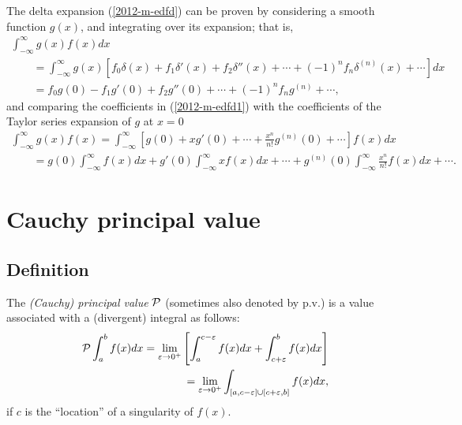 {\color{OliveGreen}
\bproof
The delta expansion (\ref{2012-m-edfd}) can be proven by considering a smooth function $g(x)$, and integrating over its expansion; that is,
\begin{equation}
\begin{split}
 \int_{-\infty}^\infty g(x) f(x) dx  \\
\qquad =
 \int_{-\infty}^\infty  g(x) \left[
f_0 \delta (x) +
f_1 \delta' (x) +
f_2 \delta'' (x)
+ \cdots  +
(-1)^n f_n \delta^{(n)}(x)
+ \cdots \right] dx \\
\qquad =
f_0 g(0) - f_1 g'(0) + f_2 g''(0) +\cdots  + (-1)^n f_n g^{(n)}
+ \cdots
,
\end{split}
\label{2012-m-edfd1}
\end{equation}
and comparing the coefficients in (\ref{2012-m-edfd1})
with the coefficients  of  the Taylor series expansion of $g$ at $x=0$
\begin{equation}
\begin{split}
 \int_{-\infty}^\infty g(x) f(x)  =
 \int_{-\infty}^\infty  \left[
g(0) +x g'(0) + \cdots + \frac{x^n}{n!}g^{(n)} (0)  + \cdots
 \right] f(x) dx \\
\qquad =
g(0) \int_{-\infty}^\infty  f(x) dx  + g'(0) \int_{-\infty}^\infty x f(x) dx   + \cdots + g^{(n)} (0)\int_{-\infty}^\infty \frac{x^n}{n!} f(x) dx  + \cdots
.
\end{split}
\label{2012-m-edfd2tse1}
\end{equation}
\eproof
}



\section{Cauchy principal value}

\subsection{Definition}

The {\em  (Cauchy) principal value} ${\cal P}$ (sometimes also denoted by $\textrm{p.v.}$)
is a value associated with a (divergent) integral as follows:
\begin{equation}
\begin{split}
{\cal P}
\int_{a}^b f(x) dx
= \lim_{\varepsilon \rightarrow 0^+}
\left[
\int_{a}^{c-\varepsilon} f(x) dx
+
\int_{c+\varepsilon}^{b} f(x) dx
\right]
\\
\qquad
=  \lim_{\varepsilon \rightarrow 0^+}
\int_{[a,c-\varepsilon] \cup [c+\varepsilon,b]}   f(x) dx
,
\end{split}
\end{equation}
if $c$ is the ``location'' of a singularity of $f(x)$.


